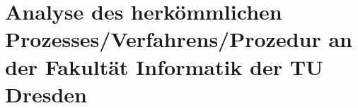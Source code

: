 \chapter{Analyse des herkömmlichen Prozesses/Verfahrens/Prozedur an der Fakultät Informatik der TU Dresden}









